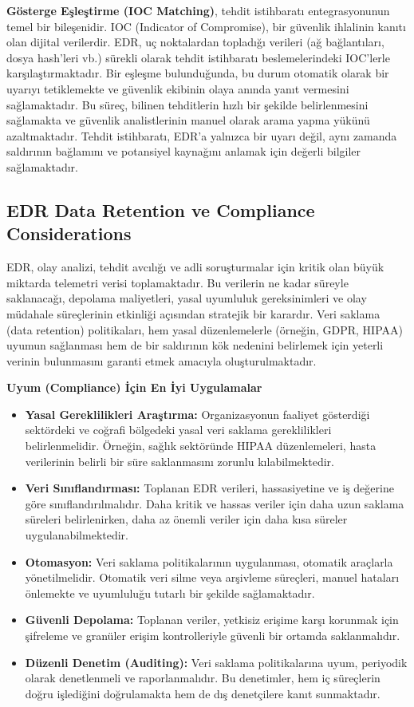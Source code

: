 \textbf{Gösterge Eşleştirme (IOC Matching)}, tehdit istihbaratı entegrasyonunun temel bir bileşenidir. IOC (Indicator of Compromise), bir güvenlik ihlalinin kanıtı olan dijital verilerdir. EDR, uç noktalardan topladığı verileri (ağ bağlantıları, dosya hash'leri vb.) sürekli olarak tehdit istihbaratı beslemelerindeki IOC'lerle karşılaştırmaktadır. Bir eşleşme bulunduğunda, bu durum otomatik olarak bir uyarıyı tetiklemekte ve güvenlik ekibinin olaya anında yanıt vermesini sağlamaktadır. Bu süreç, bilinen tehditlerin hızlı bir şekilde belirlenmesini sağlamakta ve güvenlik analistlerinin manuel olarak arama yapma yükünü azaltmaktadır. Tehdit istihbaratı, EDR'a yalnızca bir uyarı değil, aynı zamanda saldırının bağlamını ve potansiyel kaynağını anlamak için değerli bilgiler sağlamaktadır.

\subsection{EDR Data Retention ve Compliance Considerations}

EDR, olay analizi, tehdit avcılığı ve adli soruşturmalar için kritik olan büyük miktarda telemetri verisi toplamaktadır. Bu verilerin ne kadar süreyle saklanacağı, depolama maliyetleri, yasal uyumluluk gereksinimleri ve olay müdahale süreçlerinin etkinliği açısından stratejik bir karardır. Veri saklama (data retention) politikaları, hem yasal düzenlemelerle (örneğin, GDPR, HIPAA) uyumun sağlanması hem de bir saldırının kök nedenini belirlemek için yeterli verinin bulunmasını garanti etmek amacıyla oluşturulmaktadır.

\textbf{Uyum (Compliance) İçin En İyi Uygulamalar}
\begin{itemize}
    \item \textbf{Yasal Gereklilikleri Araştırma:} Organizasyonun faaliyet gösterdiği sektördeki ve coğrafi bölgedeki yasal veri saklama gereklilikleri belirlenmelidir. Örneğin, sağlık sektöründe HIPAA düzenlemeleri, hasta verilerinin belirli bir süre saklanmasını zorunlu kılabilmektedir.
    \item \textbf{Veri Sınıflandırması:} Toplanan EDR verileri, hassasiyetine ve iş değerine göre sınıflandırılmalıdır. Daha kritik ve hassas veriler için daha uzun saklama süreleri belirlenirken, daha az önemli veriler için daha kısa süreler uygulanabilmektedir.
    \item \textbf{Otomasyon:} Veri saklama politikalarının uygulanması, otomatik araçlarla yönetilmelidir. Otomatik veri silme veya arşivleme süreçleri, manuel hataları önlemekte ve uyumluluğu tutarlı bir şekilde sağlamaktadır.
    \item \textbf{Güvenli Depolama:} Toplanan veriler, yetkisiz erişime karşı korunmak için şifreleme ve granüler erişim kontrolleriyle güvenli bir ortamda saklanmalıdır.
    \item \textbf{Düzenli Denetim (Auditing):} Veri saklama politikalarına uyum, periyodik olarak denetlenmeli ve raporlanmalıdır. Bu denetimler, hem iç süreçlerin doğru işlediğini doğrulamakta hem de dış denetçilere kanıt sunmaktadır.
\end{itemize}

